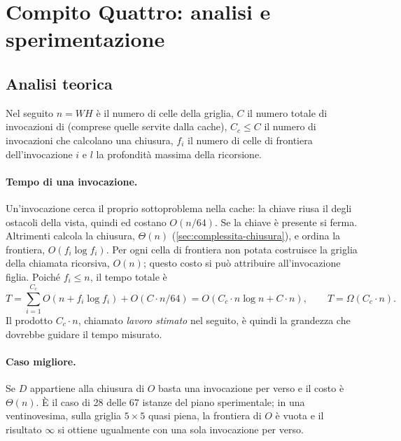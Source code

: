 \section{Compito Quattro: analisi e sperimentazione}
\label{sec:compito4}

\subsection{Analisi teorica}
\label{sec:analisi-teorica}

Nel seguito $n = WH$ è il numero di celle della griglia, $C$ il numero
totale di invocazioni di \cmin{} (comprese quelle servite dalla cache),
$C_c \le C$ il numero di invocazioni che calcolano una chiusura, $f_i$ il
numero di celle di frontiera dell'invocazione $i$ e $l$ la profondità
massima della ricorsione.

\paragraph{Tempo di una invocazione.} Un'invocazione cerca il proprio
sottoproblema nella cache: la chiave riusa il  degli ostacoli
della vista, quindi  ed  costano $O(n/64)$. Se la
chiave è presente si ferma. Altrimenti calcola la chiusura, $\Theta(n)$
(\cref{sec:complessita-chiusura}), e ordina la frontiera,
$O(f_i \log f_i)$. Per ogni cella di frontiera non potata costruisce la
griglia della chiamata ricorsiva, $O(n)$; questo costo si può attribuire
all'invocazione figlia. Poiché $f_i \le n$, il tempo totale è
\begin{equation}
  T = \sum_{i=1}^{C_c} O(n + f_i \log f_i) + O(C \cdot n/64)
    = O(C_c \cdot n \log n + C \cdot n),
  \qquad T = \Omega(C_c \cdot n).
  \label{eq:tempo}
\end{equation}
Il prodotto $C_c \cdot n$, chiamato \emph{lavoro stimato} nel seguito, è
quindi la grandezza che dovrebbe guidare il tempo misurato.

\paragraph{Caso migliore.} Se $D$ appartiene alla chiusura di $O$ basta una
invocazione per verso e il costo è $\Theta(n)$. È il caso di 28 delle 67
istanze del piano sperimentale; in una ventinovesima, sulla griglia
$5\times5$ quasi piena, la frontiera di $O$ è vuota e il risultato $\infty$
si ottiene ugualmente con una sola invocazione per verso.

